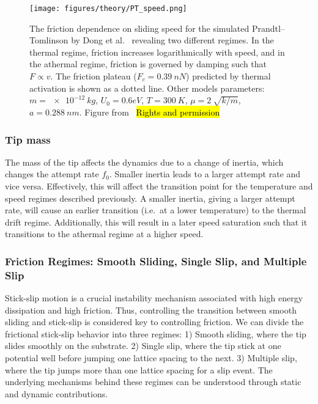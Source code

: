 \begin{figure}[H]
  \centering
  \texttt{[image: figures/theory/PT\_speed.png]}
  \caption{The friction dependence on sliding speed for the simulated Prandtl–Tomlinson by Dong et al.~\cite{Yalin_2011} revealing two different regimes. In the thermal regime, friction increases logarithmically with speed, and in the athermal regime, friction is governed by damping such that $F\propto v$. The friction plateau ($F_c = \SI{0.39}{nN}$) predicted by thermal activation is shown as a dotted line. Other models parameters: $m=\SI{e-12}{kg}$, $U_0={0.6}{eV}$, $T = \SI{300}{K}$, $\mu=\SI{2}{\sqrt{k/m}}$, $a=\SI{0.288}{nm}$. Figure from~\cite{Yalin_2011} \hl{Rights and permission}}
  \label{fig:PT_speed}
\end{figure}


\subsubsection{Tip mass}
The mass of the tip affects the dynamics due to a change of inertia, which changes the attempt rate $f_0$. Smaller inertia leads to a larger attempt rate and vice versa. Effectively, this will affect the transition point for the temperature and speed regimes described previously. A smaller inertia, giving a larger attempt rate, will cause an earlier transition (i.e.\ at a lower temperature) to the thermal drift regime. Additionally, this will result in a later speed saturation such that it transitions to the athermal regime at a higher speed. 


\subsubsection{Friction Regimes: Smooth Sliding, Single Slip, and Multiple Slip}
Stick-slip motion is a crucial instability mechanism associated with high energy dissipation and high friction. Thus, controlling the transition between smooth sliding and stick-slip is considered key to controlling friction. We can divide the frictional stick-slip behavior into three regimes: 1) Smooth sliding, where the tip slides smoothly on the substrate. 2) Single slip, where the tip stick at one potential well before jumping one lattice spacing to the next. 3) Multiple slip, where the tip jumps more than one lattice spacing for a slip event. The underlying mechanisms behind these regimes can be understood through static and dynamic contributions. 


